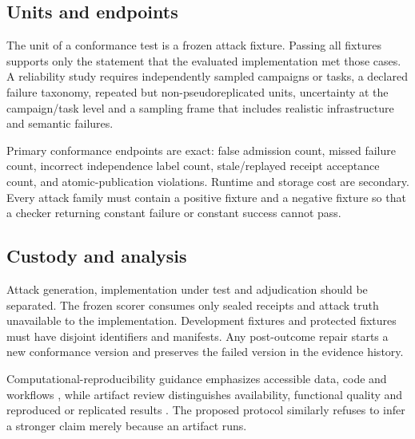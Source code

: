 \subsection{Units and endpoints}

The unit of a conformance test is a frozen attack fixture. Passing all fixtures
supports only the statement that the evaluated implementation met those cases. A
reliability study requires independently sampled campaigns or tasks, a declared
failure taxonomy, repeated but non-pseudoreplicated units, uncertainty at the
campaign/task level and a sampling frame that includes realistic infrastructure
and semantic failures.

Primary conformance endpoints are exact: false admission count, missed failure
count, incorrect independence label count, stale/replayed receipt acceptance count,
and atomic-publication violations. Runtime and storage cost are secondary. Every
attack family must contain a positive fixture and a negative fixture so that a
checker returning constant failure or constant success cannot pass.

\subsection{Custody and analysis}

Attack generation, implementation under test and adjudication should be separated.
The frozen scorer consumes only sealed receipts and attack truth unavailable to the
implementation. Development fixtures and protected fixtures must have disjoint
identifiers and manifests. Any post-outcome repair starts a new conformance version
and preserves the failed version in the evidence history.

Computational-reproducibility guidance emphasizes accessible data, code and
workflows \citep{stodden2016enhancing}, while artifact review distinguishes
availability, functional quality and reproduced or replicated results
\citep{acm2020badging}. The proposed protocol similarly refuses to infer a stronger
claim merely because an artifact runs.

